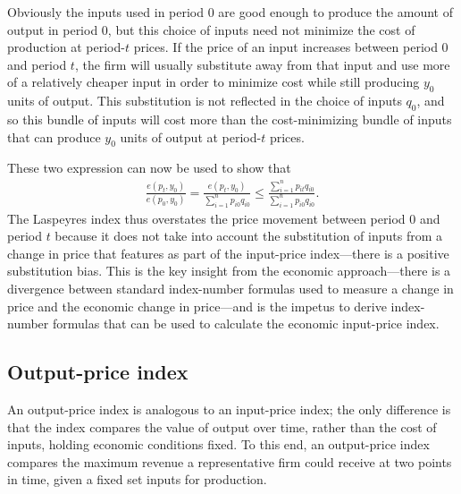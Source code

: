 \documentclass[]{article}
\begin{document}
Obviously the inputs used in period 0 are good enough to produce the amount of output in period 0, but this choice of inputs need not minimize the cost of production at period-\(t\) prices. If the price of an input increases between period 0 and period \(t\), the firm will usually substitute away from that input and use more of a relatively cheaper input in order to minimize cost while still producing \(y_{0}\) units of output. This substitution is not reflected in the choice of inputs \(q_{0}\), and so this bundle of inputs will cost more than the cost-minimizing bundle of inputs that can produce \(y_{0}\) units of output at period-\(t\) prices.

These two expression can now be used to show that
\begin{align*}
\frac{e(p_{t}, y_{0})}{e(p_{0}, y_{0})} = \frac{e(p_{t}, y_{0})}{\sum_{i = 1}^{n} p_{i0} q_{i0}} \leq \frac{\sum_{i = 1}^{n} p_{it} q_{i0}}{\sum_{i = 1}^{n} p_{i0} q_{i0}}.
\end{align*}
The Laspeyres index thus overstates the price movement between period 0 and period \(t\) because it does not take into account the substitution of inputs from a change in price that features as part of the input-price index---there is a positive substitution bias. This is the key insight from the economic approach---there is a divergence between standard index-number formulas used to measure a change in price and the economic change in price---and is the impetus to derive index-number formulas that can be used to calculate the economic input-price index.

\hypertarget{output-price-index}{%
\subsection{Output-price index}\label{output-price-index}}

An output-price index is analogous to an input-price index; the only difference is that the index compares the value of output over time, rather than the cost of inputs, holding economic conditions fixed. To this end, an output-price index compares the maximum revenue a representative firm could receive at two points in time, given a fixed set inputs for production.
\end{document}
